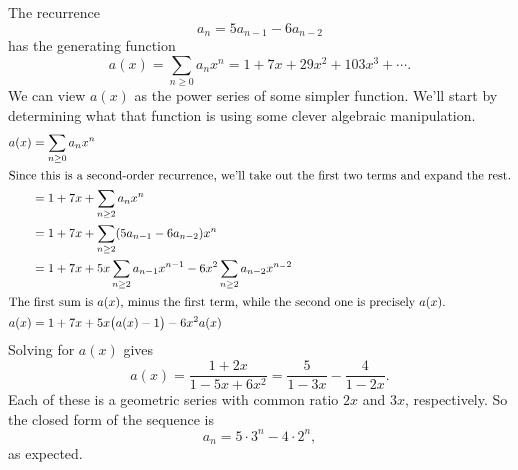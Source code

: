 \documentclass[../m055main.tex]{subfiles}
\begin{document}
\begin{example}
    The recurrence
    \[ a_n = 5a_{n-1} - 6a_{n-2} \]
    has the generating function
    \[ a(x) = \sum_{n \geq 0} a_n x^{n} = 1 + 7x + 29x^2 + 103x^3 + \cdots. \]
    We can view $a(x)$ as the power series of some simpler function.
    We'll start by determining what that function is using some clever algebraic manipulation.
    \begin{align*}
        a(x) &= \sum_{n \geq 0} a_n x^{n} \\
        \intertext{Since this is a second-order recurrence, we'll take out the first two terms and expand the rest.}
        &= 1 + 7x + \sum_{n \geq 2} a_n x^{n} \\
        &= 1 + 7x + \sum_{n \geq 2} (5a_{n-1} - 6a_{n-2}) x^{n} \\
        &= 1 + 7x + 5x \sum_{n \geq 2} a_{n-1} x^{n-1} - 6x^2 \sum_{n \geq 2} a_{n-2} x^{n_-2} \\
        \intertext{The first sum is $a(x)$, minus the first term, while the second one is precisely $a(x)$.}
        a(x) &= 1 + 7x + 5x \big( a(x) - 1 \big) - 6x^2 a(x)
    \end{align*}
    Solving for $a(x)$ gives
    \[ a(x) = \frac{1 + 2x}{1 - 5x + 6x^2} = \frac{5}{1 - 3x} - \frac{4}{1 - 2x}. \]
    Each of these is a geometric series with common ratio $2x$ and $3x$, respectively.
    So the closed form of the sequence is
    \[ a_n = 5 \cdot 3^{n} - 4 \cdot 2^{n}, \]
    as expected.
\end{example}
\end{document}
